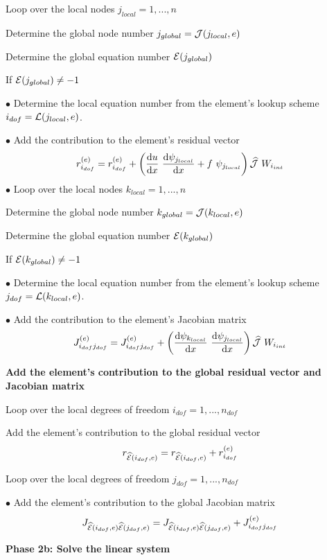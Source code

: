 \begin{DoxyItemize}
\begin{DoxyItemize}
\item Loop over the local nodes $ j_{local}=1,...,n $
\begin{DoxyItemize}
\item Determine the global node number $ j_{global}={\cal J}(j_{local},e)$
\item Determine the global equation number $ {\cal E}( j_{global}) $
\item If $ {\cal E}( j_{global}) \ne -1 $ \par
 $ \bullet $ Determine the local equation number from the element's lookup scheme $ i_{dof}= {\cal L}(j_{local},e)$.\par
 $ \bullet $ Add the contribution to the element's residual vector \[ r_{i_{dof}}^{(e)} = r_{i_{dof}}^{(e)} + \left( \frac{\mbox{d} u}{\mbox{d} x} \ \frac{\mbox{d} \psi_{j_{local}}}{\mbox{d} x} + f \ \psi_{j_{local}} \right) \widehat{\cal J}\ W_{i_{int}} \] $ \bullet $ Loop over the local nodes $ k_{local}=1,...,n$
\begin{DoxyItemize}
\item Determine the global node number $ k_{global}={\cal J}(k_{local},e)$
\item Determine the global equation number $ {\cal E}( k_{global}) $
\item If $ {\cal E}( k_{global}) \ne -1 $ \par
 $ \bullet $ Determine the local equation number from the element's lookup scheme $ j_{dof}= {\cal L}(k_{local},e)$.\par
 $ \bullet $ Add the contribution to the element's Jacobian matrix \[ J_{i_{dof}j_{dof}}^{(e)} = J_{i_{dof}j_{dof}}^{(e)} + \left( \frac{\mbox{d} \psi_{k_{local}}}{\mbox{d} x} \ \frac{\mbox{d} \psi_{j_{local}}}{\mbox{d} x} \right) \widehat{\cal J} \ W_{i_{int}} \]
\end{DoxyItemize}
\end{DoxyItemize}\par
 \par
 \begin{center} {\bfseries  Add the element's contribution to the global residual vector and Jacobian matrix } \end{center}  \par

\item Loop over the local degrees of freedom $ i_{dof}=1,...,n_{dof} $
\begin{DoxyItemize}
\item Add the element's contribution to the global residual vector \[ r_{\widehat{\cal E}(i_{dof},e)} = r_{\widehat{\cal E}(i_{dof},e)} + r_{i_{dof}}^{(e)} \]
\item Loop over the local degrees of freedom $ j_{dof}=1,...,n_{dof}$ \par
 $\bullet $ Add the element's contribution to the global Jacobian matrix \[ J_{\widehat{\cal E}(i_{dof},e)\widehat{\cal E}(j_{dof},e) } = J_{\widehat{\cal E}(i_{dof},e)\widehat{\cal E}(j_{dof},e) } + J_{i_{dof} j_{dof}}^{(e)} \]
\end{DoxyItemize}
\end{DoxyItemize}{\bfseries  Phase 2b\-: Solve the linear system }
\end{DoxyItemize}


